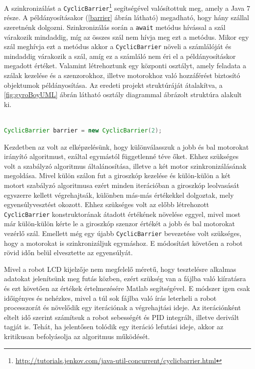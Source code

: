 A szinkronizálást a \texttt{CyclicBarrier}\footnote{\href{http://tutorials.jenkov.com/java-util-concurrent/cyclicbarrier.html}{http://tutorials.jenkov.com/java-util-concurrent/cyclicbarrier.html}} segítségével valósítottuk meg, amely a Java 7 része. A példányosításakor (\ref{barrier} ábrán látható) megadható, hogy hány szállal szeretnénk dolgozni. Szinkronizálás során a \texttt{await} metódus hívással a szál várakozik mindaddig, míg az összes szál nem hívja meg ezt a metódus. Mikor egy szál meghívja ezt a metódus akkor a \texttt{CyclicBarrier} növeli a számlálóját és mindaddig várakozik a szál, amíg ez a számláló nem éri el a példányosításkor megadott értéket. Valamint létrehoztunk egy központi osztályt, amely feladata a szálak kezelése és a szenzorokhoz, illetve motorokhoz való hozzáférést biztosító objektumok példányosítása. Az eredeti projekt struktúráját átalakítva, a \ref{fig:gyroBoyUML} ábrán látható osztály diagrammal ábrázolt struktúra alakult ki.

\begin{lstlisting}[label=barrier, caption= CyclicBarrier példányosítása , language=Java]

CyclicBarrier barrier = new CyclicBarrier(2);

\end{lstlisting}

Kezdetben az volt az elképzelésünk, hogy különválasszuk a jobb és bal motorokat irányító algoritmust, ezáltal egymástól függetlenné téve őket. Ehhez szükséges volt a szabályzó algoritmus általánosítása, illetve a két motor szinkronizálásának megoldása. Mivel külön szálon fut a giroszkóp kezelése és külön-külön a két motort szabályzó algoritmusa ezért minden iterációban a giroszkóp leolvasását egyszerre kellett végrehajtsák, különben más-más értékekkel dolgoztak, mely egyensúlyvesztést okozott. Ehhez szükséges volt az előbb létrehozott \texttt{CyclicBarrier} konstruktorának átadott értékének növelése eggyel, mivel most már külön-külön kérte le a giroszkóp szenzor értékét a jobb és bal motorokat vezérlő szál. Emellett még egy újabb \texttt{CyclicBarrier} bevezetése volt szükséges, hogy a motorokat is szinkronizáljuk egymáshoz. E módosítást követően a robot rövid időn belül elvesztette az egyensúlyát.

Mivel a robot LCD kijelzője nem megfelelő méretű, hogy tesztelésre alkalmas adatokat jelenítsünk meg futás közben, ezért szükség van a fájlba való kiíratásra és ezt követően az értékek értelmezésére Matlab segítségével. E módszer igen csak időigényes és nehézkes, mivel a túl sok fájlba való írás leterheli a robot processzorát és növelődik egy iterációnak a végrehajtási ideje. Az iterációnként eltelt idő szerint számítsuk a robot sebességét és PID integrált, illetve derivált tagját is. Tehát, ha jelentősen tolódik egy iteráció lefutási ideje, akkor az kritikusan befolyásolja az algoritmus működését.

